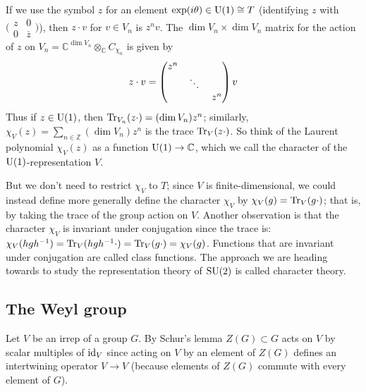 \documentclass[../../rtnotes.tex]{subfiles}
\begin{document}
If we use the symbol $z$ for an element $\exp(i\theta)\in \operatorname{U}(1)\cong T$ (identifying $z$ with $\bigl(\!\begin{smallmatrix}
    z & 0 \\ 0 & \overline z
\end{smallmatrix}\!\bigr)$), then $z\cdot v$ for $v\in V_n$ is $z^nv$. The $\dim V_n\times \dim V_n$ matrix for the action of $z$ on $V_n = \mathbb C^{\dim V_n}\otimes_{\mathbb C}C_{\chi_n}$ is given by
\[z\cdot v = \begin{pmatrix}
    z^n & & \\
    & \mathbin{\rotatebox[origin=c]{-10}{$\ddots$}} & \\
    & & z^n
\end{pmatrix}v\]
Thus if $z\in\operatorname{U}(1)$, then $\Tr_{V_n}(z\cdot) = (\dim V_n)z^n$; similarly, $\chi_V(z) = \sum_{n\in\mathbb Z}(\dim V_n)z^n$ is the trace $\Tr_V(z\cdot)$. So think of the Laurent polynomial $\chi_V(z)$ as a function $\operatorname{U}(1)\to \mathbb C$, which we call the character of the $\operatorname{U}(1)$-representation $V$.

But we don't need to restrict $\chi_V$ to $T$; since $V$ is finite-dimensional, we could instead define more generally define the character $\chi_V$ by $\chi_V(g) = \Tr_V(g\cdot)$; that is, by taking the trace of the group action on $V$. Another observation is that the character $\chi_V$ is invariant under conjugation since the trace is: $\chi_V(hgh^{-1}) = \Tr_V(hgh^{-1}\cdot) = \Tr_V(g\cdot) = \chi_V(g)$. Functions that are invariant under conjugation are called class functions. The approach we are heading towards to study the representation theory of $\operatorname{SU}(2)$ is called character theory.

\subsection{The Weyl group}
Let $V$ be an irrep of a group $G$. By Schur's lemma $Z(G)\subset G$ acts on $V$ by scalar multiples of $\operatorname{id}_V$ since acting on $V$ by an element of $Z(G)$ defines an intertwining operator $V\to V$ (because elements of $Z(G)$ commute with every element of $G$).
\end{document}
